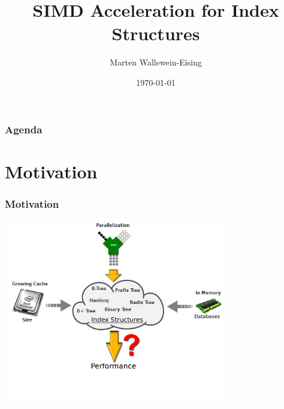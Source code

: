 \documentclass{beamer}
\title{SIMD Acceleration for Index Structures}
\author{Marten Wallewein-Eising}
\date{\today}
\institute{Otto von Guericke Univerity, Magdeburg}
\begin{document}
\begin{frame}[plain]
 \titlepage
\end{frame}



\section[Agenda]{}
\begin{frame}
\frametitle{Agenda}
\tableofcontents
\end{frame}

\section{Motivation}
\begin{frame}
\frametitle{Motivation}
	\begin{center}
		\includegraphics[width=0.73\textwidth]{img/big_picture.png}
	\end{center}
\end{frame}
\end{document}
